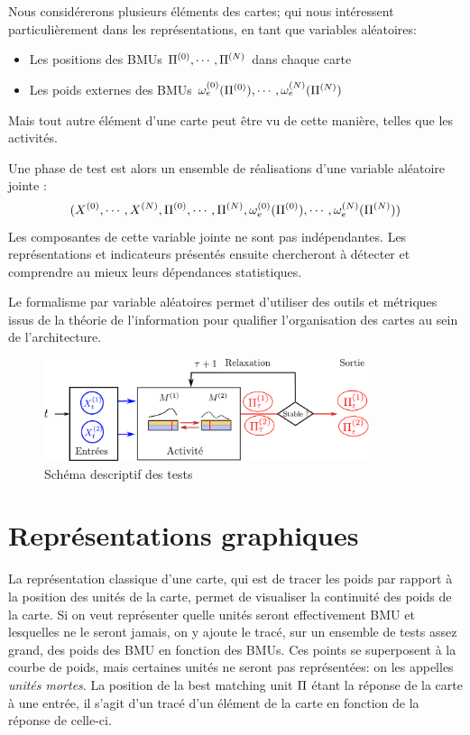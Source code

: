 Nous considérerons plusieurs éléments des cartes; qui nous intéressent particulièrement dans les représentations, en tant que variables aléatoires: 
\begin{itemize}
\item Les positions des BMUs $\Pi^{({0})}, \cdots, \Pi^{({N})}$ dans chaque carte
\item Les poids externes des BMUs $\omega_e^{({0})}(\Pi^{({0})}), \cdots, \omega_e^{({N})}(\Pi^{({N})})$
\end{itemize}
Mais tout autre élément d'une carte peut être vu de cette manière, telles que les activités.


Une phase de test est alors un ensemble de réalisations d'une variable aléatoire jointe : 
$$(X^{({0})}, \cdots, X^{({N})}, \Pi^{({0})}, \cdots, \Pi^{({N})}, \omega_e^{({0})}(\Pi^{({0})}), \cdots, \omega_e^{({N})}(\Pi^{({N})}))$$
Les composantes de cette variable jointe ne sont pas indépendantes. Les représentations et indicateurs présentés ensuite chercheront à détecter et comprendre au mieux leurs dépendances statistiques.

Le formalisme par variable aléatoires permet d'utiliser des outils et métriques issus de la théorie de l'information pour qualifier l'organisation des cartes au sein de l'architecture.

\begin{figure}
\centering
\includegraphics[width=0.85\textwidth]{tests_2maps.pdf}
\caption{Schéma descriptif des tests}
\label{fig:flowchart}
\end{figure}


\section{Représentations graphiques}
La représentation classique d'une carte, qui est de tracer les poids par rapport à la position des unités de la carte, permet de visualiser la continuité des poids de la carte. Si on veut représenter quelle unités seront effectivement BMU et lesquelles ne le seront jamais, on y ajoute le tracé, sur un ensemble de tests assez grand, des poids des BMU en fonction des BMUs. Ces points se superposent à la courbe de poids, mais certaines unités ne seront pas représentées: on les appelles \emph{unités mortes}. La position de la best matching unit $\Pi$ étant la réponse de la carte à une entrée, il s'agit d'un tracé d'un élément de la carte en fonction de la réponse de celle-ci. 

